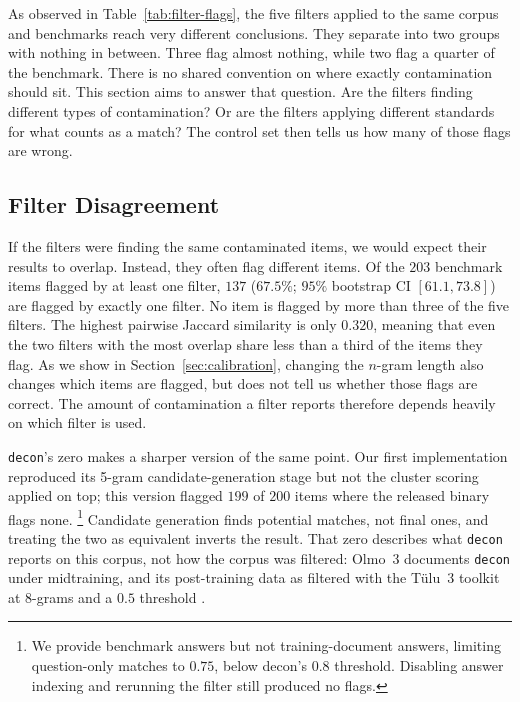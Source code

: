 \documentclass[11pt]{article}
\begin{document}
As observed in Table~\ref{tab:filter-flags}, the five filters applied to the same corpus and benchmarks reach very different conclusions. They separate into two groups with nothing in between. Three flag almost nothing, while two flag a quarter of the benchmark. There is no shared convention on where exactly contamination should sit. This section aims to answer that question. Are the filters finding different types of contamination? Or are the filters applying different standards for what counts as a match? The control set then tells us how many of those flags are wrong.

\subsection{Filter Disagreement}
\label{sec:filter-disagreement}

If the filters were finding the same contaminated items, we would expect their results to overlap. Instead, they often flag different items. Of the $203$ benchmark items flagged by at least one filter, $137$ ($67.5\%$; $95\%$ bootstrap CI $[61.1, 73.8]$) are flagged by exactly one filter. No item is flagged by more than three of the five filters. The highest pairwise Jaccard similarity is only $0.320$, meaning that even the two filters with the most overlap share less than a third of the items they flag. As we show in Section~\ref{sec:calibration}, changing the $n$-gram length also changes which items are flagged, but does not tell us whether those flags are correct. The amount of contamination a filter reports therefore depends heavily on which filter is used.

\texttt{decon}'s zero makes a sharper version of the same point. Our first
implementation reproduced its 5-gram candidate-generation stage but not the
cluster scoring applied on top; this version flagged $199$ of $200$ items where the released binary flags none. \footnote{We provide benchmark answers but not training-document answers, limiting question-only matches to $0.75$, below decon's $0.8$ threshold. Disabling answer indexing and rerunning the filter still produced no flags.} Candidate generation finds potential matches, not final ones, and treating the two as equivalent inverts the result. That zero describes what \texttt{decon} reports on this corpus, not how the corpus was filtered: Olmo~3 documents \texttt{decon} under midtraining, and its post-training data as filtered with the T\"{u}lu~3 toolkit at $8$-grams and a $0.5$ threshold \citep{olmo2025olmo3}.
\end{document}
